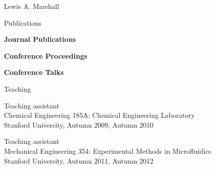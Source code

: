 \documentclass{article}
\begin{document}
\begin{cv}{Lewis A. Marshall}
\begin{cvlist}{Publications}
    \item \textbf{Journal Publications}


  \item \textbf{Conference Proceedings}


  \item \textbf{Conference Talks}

\end{cvlist}

%


  \begin{cvlist}{Teaching}
    \item Teaching assistant\\
      Chemical Engineering 185A: Chemical Engineering Laboratory\\
      Stanford University, Autumn 2009, Autumn 2010
    \item Teaching assistant\\
      Mechanical Engineering 354: Experimental Methods in Microfluidics\\
      Stanford University, Autumn 2011, Autumn 2012
  \end{cvlist}


\end{cv}
\end{document}
